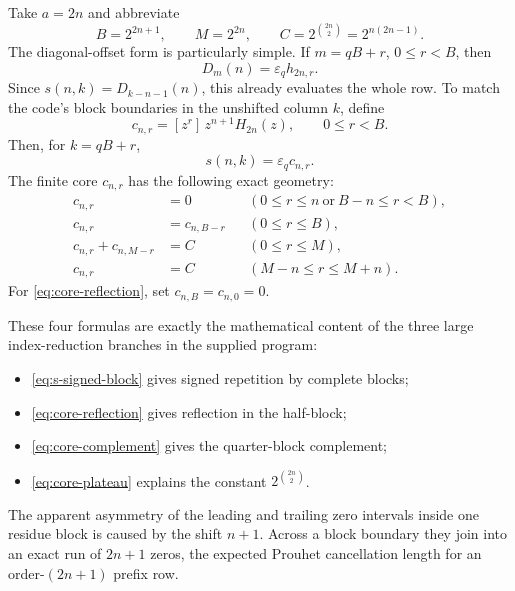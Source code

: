 \documentclass[11pt,oneside]{article}
\theoremstyle{definition}
\theoremstyle{remark}
\newcommand{\eps}{\varepsilon}
\newcommand{\Diag}{D}
\newcommand{\coeff}[2]{[z^{#1}]\,#2}
\begin{document}
Take $a=2n$ and abbreviate
\begin{equation}
 B=2^{2n+1},\qquad M=2^{2n},\qquad
 C=2^{\binom{2n}{2}}=2^{n(2n-1)}.
 \label{eq:row-constants}
\end{equation}
The diagonal-offset form is particularly simple.  If
$m=qB+r$, $0\le r<B$, then
\begin{equation}
 \Diag_m(n)=\eps_qh_{2n,r}.
 \label{eq:D-block-row}
\end{equation}
Since $s(n,k)=\Diag_{k-n-1}(n)$, this already evaluates the whole row.
To match the code's block boundaries in the unshifted column $k$, define
\begin{equation}
 c_{n,r}=\coeff{r}{z^{n+1}H_{2n}(z)},
 \qquad 0\le r<B.
 \label{eq:core-c}
\end{equation}
Then, for $k=qB+r$,
\begin{equation}
 s(n,k)=\eps_qc_{n,r}.
 \label{eq:s-signed-block}
\end{equation}
The finite core $c_{n,r}$ has the following exact geometry:
\begin{align}
 c_{n,r}&=0
 &&(0\le r\le n\ \text{or}\ B-n\le r<B),
 \label{eq:core-zero}\\
 c_{n,r}&=c_{n,B-r}
 &&(0\le r\le B),
 \label{eq:core-reflection}\\
 c_{n,r}+c_{n,M-r}&=C
 &&(0\le r\le M),
 \label{eq:core-complement}\\
 c_{n,r}&=C
 &&(M-n\le r\le M+n).
 \label{eq:core-plateau}
\end{align}
For \eqref{eq:core-reflection}, set $c_{n,B}=c_{n,0}=0$.

These four formulas are exactly the mathematical content of the three large
index-reduction branches in the supplied program:
\begin{itemize}
 \item \eqref{eq:s-signed-block} gives signed repetition by complete blocks;
 \item \eqref{eq:core-reflection} gives reflection in the half-block;
 \item \eqref{eq:core-complement} gives the quarter-block complement;
 \item \eqref{eq:core-plateau} explains the constant
       $2^{\binom{2n}{2}}$.
\end{itemize}
The apparent asymmetry of the leading and trailing zero intervals inside one
residue block is caused by the shift $n+1$.  Across a block boundary they join
into an exact run of $2n+1$ zeros, the expected Prouhet cancellation length
for an order-$(2n+1)$ prefix row.
\end{document}
